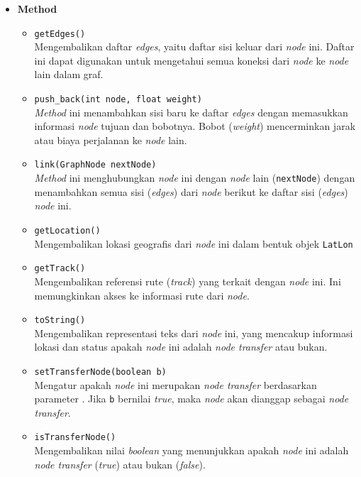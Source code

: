 \begin{itemize}
    \item \textbf{Method}
    \begin{itemize}
        \item \texttt{getEdges()}
        \\ Mengembalikan daftar \textit{edges}, yaitu daftar sisi keluar dari \textit{node} ini. Daftar ini dapat digunakan untuk mengetahui semua koneksi dari \textit{node} ke \textit{node} lain dalam graf.
        \item \texttt{push\_back(int node, float weight)}
        \\ \textit{Method} ini menambahkan sisi baru ke daftar \textit{edges} dengan memasukkan informasi \textit{node} tujuan dan bobotnya. Bobot (\textit{weight}) mencerminkan jarak atau biaya perjalanan ke \textit{node} lain.
        \item \texttt{link(GraphNode nextNode)}
        \\ \textit{Method} ini menghubungkan \textit{node} ini dengan \textit{node} lain (\texttt{nextNode}) dengan menambahkan semua sisi (\textit{edges}) dari \textit{node} berikut ke daftar sisi (\textit{edges}) \textit{node} ini.
        \item \texttt{getLocation()}
        \\ Mengembalikan lokasi geografis dari \textit{node} ini dalam bentuk objek \texttt{LatLon}
        \item \texttt{getTrack()}
        \\ Mengembalikan referensi rute (\textit{track}) yang terkait dengan \textit{node} ini. Ini memungkinkan akses ke informasi rute dari \textit{node}.
        \item \texttt{toString()}
        \\ Mengembalikan representasi teks dari \textit{node} ini, yang mencakup informasi lokasi dan status apakah \textit{node} ini adalah \textit{node transfer} atau bukan.
        \item \texttt{setTransferNode(boolean b)}
        \\ Mengatur apakah \textit{node} ini merupakan \textit{node transfer} berdasarkan parameter . Jika \texttt{b} bernilai \textit{true}, maka \textit{node} akan dianggap sebagai \textit{node transfer}.
        \item \texttt{isTransferNode()}
        \\ Mengembalikan nilai \textit{boolean} yang menunjukkan apakah \textit{node} ini adalah \textit{node transfer} (\textit{true}) atau bukan (\textit{false}).
    \end{itemize}
\end{itemize}

